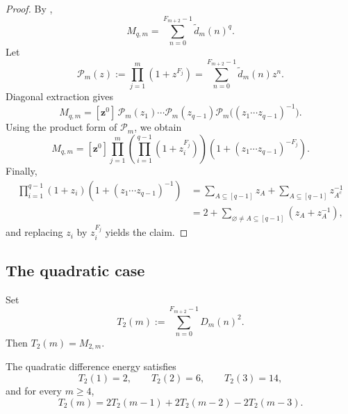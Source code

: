 \begin{proof}
By ,
\[
  M_{q,m}
  =
  \sum_{n=0}^{F_{m+2}-1}\widetilde d_m(n)^q.
\]
Let
\[
  \mathcal P_m(z):=\prod_{j=1}^m(1+z^{F_j})
  =
  \sum_{n=0}^{F_{m+2}-1}\widetilde d_m(n)z^n.
\]
Diagonal extraction gives
\[
  M_{q,m}
  =
  [\mathbf z^0]\,
  \mathcal P_m(z_1)\cdots \mathcal P_m(z_{q-1})
  \mathcal P_m\bigl((z_1\cdots z_{q-1})^{-1}\bigr).
\]
Using the product form of \(\mathcal P_m\), we obtain
\[
  M_{q,m}
  =
  [\mathbf z^0]
  \prod_{j=1}^m
  \left(
    \prod_{i=1}^{q-1}(1+z_i^{F_j})
  \right)
  \left(
    1+(z_1\cdots z_{q-1})^{-F_j}
  \right).
\]
Finally,
\begin{align*}
  \prod_{i=1}^{q-1}(1+z_i)\left(1+(z_1\cdots z_{q-1})^{-1}\right)
  &=
  \sum_{A\subseteq [q-1]}z_A
  +
  \sum_{A\subseteq [q-1]}z_{A^c}^{-1} \\
  &=
  2+\sum_{\varnothing\neq A\subseteq [q-1]}(z_A+z_A^{-1}),
 \end{align*}
and replacing \(z_i\) by \(z_i^{F_j}\) yields the claim.
\end{proof}

\subsection{The quadratic case}

\begin{definition}
\label{def:T2}
Set
\[
  T_2(m):=\sum_{n=0}^{F_{m+2}-1}D_m(n)^2.
\]
Then \(T_2(m)=M_{2,m}\).
\end{definition}

\begin{theorem}
\label{thm:cubic-recurrence}
The quadratic difference energy satisfies
\[
  T_2(1)=2,\qquad T_2(2)=6,\qquad T_2(3)=14,
\]
and for every \(m\ge 4\),
\[
  T_2(m)=2T_2(m-1)+2T_2(m-2)-2T_2(m-3).
\]
\end{theorem}

